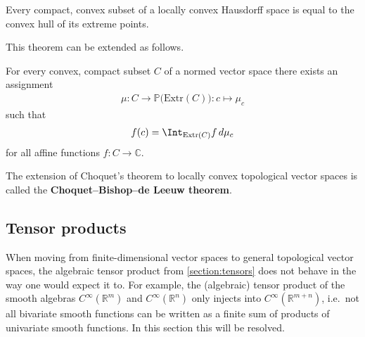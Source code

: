     \begin{theorem}\label{functional:krein_milman}
        Every compact, convex subset of a locally convex Hausdorff space is equal to the convex hull of its extreme points.
    \end{theorem}
    This theorem can be extended as follows.
    \begin{theorem}[Choquet]\label{functional:choquet}
        For every convex, compact subset $C$ of a normed vector space there exists an assignment
        \begin{gather}
            \mu:C\rightarrow\mathbb{P}\big(\mathrm{Extr}(C)\big):c\mapsto\mu_c
        \end{gather}
        such that
        \begin{gather}
            f(c) = \Int_{\mathrm{Extr}(C)}f\,d\mu_c
        \end{gather}
        for all affine functions $f:C\rightarrow\mathbb{C}$.
    \end{theorem}
    \begin{remark}
        The extension of Choquet's theorem to locally convex topological vector spaces is called the \textbf{Choquet--Bishop--de Leeuw theorem}.
    \end{remark}


\subsection{Tensor products}

    When moving from finite-dimensional vector spaces to general topological vector spaces, the algebraic tensor product from \cref{section:tensors} does not behave in the way one would expect it to. For example, the (algebraic) tensor product of the smooth algebras $C^\infty(\mathbb{R}^m)$ and $C^\infty(\mathbb{R}^n)$ only injects into $C^\infty(\mathbb{R}^{m+n})$, i.e.~not all bivariate smooth functions can be written as a finite sum of products of univariate smooth functions. In this section this will be resolved.

